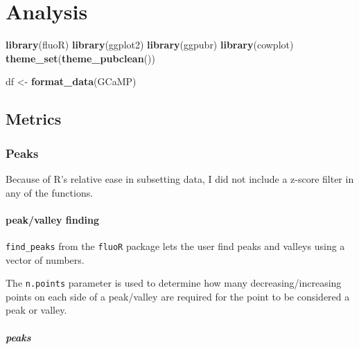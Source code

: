 \documentclass[
]{book}
\newenvironment{Shaded}{\begin{snugshade}}{\end{snugshade}}
\newcommand{\KeywordTok}[1]{\textcolor[rgb]{0.13,0.29,0.53}{\textbf{#1}}}
\newcommand{\NormalTok}[1]{#1}
\newcommand{\StringTok}[1]{\textcolor[rgb]{0.31,0.60,0.02}{#1}}
\begin{document}
\hypertarget{analysis}{%
\chapter{Analysis}\label{analysis}}

\begin{Shaded}
\begin{Highlighting}[]
\KeywordTok{library}\NormalTok{(fluoR)}
\KeywordTok{library}\NormalTok{(ggplot2)}
\KeywordTok{library}\NormalTok{(ggpubr)}
\KeywordTok{library}\NormalTok{(cowplot)}
\KeywordTok{theme_set}\NormalTok{(}\KeywordTok{theme_pubclean}\NormalTok{())}

\NormalTok{df <-}\StringTok{ }\KeywordTok{format_data}\NormalTok{(GCaMP)}
\end{Highlighting}
\end{Shaded}

\hypertarget{analysis-metrics}{%
\section{Metrics}\label{analysis-metrics}}

\hypertarget{analysis-metrics-peaks}{%
\subsection{Peaks}\label{analysis-metrics-peaks}}

Because of R's relative ease in subsetting data, I did not include a z-score filter in any of the functions.

\hypertarget{analysis-metrics-peaks-find}{%
\subsubsection{peak/valley finding}\label{analysis-metrics-peaks-find}}

\texttt{find\_peaks} from the \texttt{fluoR} package lets the user find peaks and valleys using a vector of numbers.

The \texttt{n.points} parameter is used to determine how many decreasing/increasing points on each side of a peak/valley are required for the point to be considered a peak or valley.

\hypertarget{analysis-metrics-peaks-find-peaks}{%
\paragraph{peaks}\label{analysis-metrics-peaks-find-peaks}}
\end{document}

